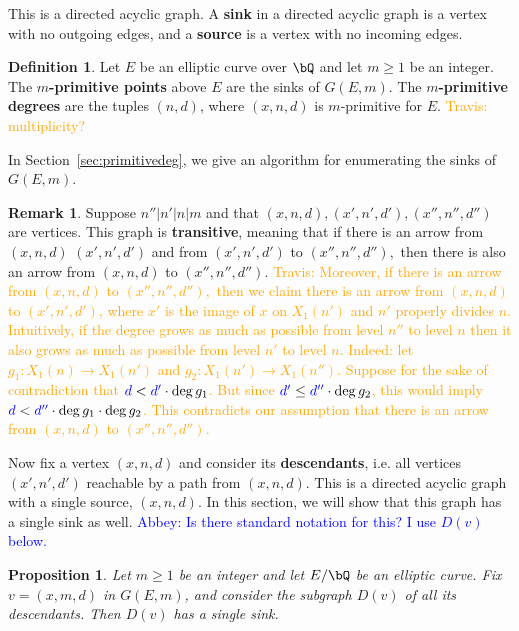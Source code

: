 \documentclass[11pt,reqno]{amsart}
\theoremstyle{plain}
\newtheorem{proposition}[theorem]{Proposition}
\theoremstyle{definition}
\newtheorem{remark}[theorem]{Remark}
\newtheorem{definition}[theorem]{Definition}
\newcommand{\Q}{\bQ}
\newcommand{\abbey}[1]{\textcolor{blue}{Abbey: #1}}
\newcommand{\travis}[1]{\textcolor{orange}{Travis: #1}}
\newcommand{\abedit}[1]{{\color{blue} #1}}
\begin{document}
This is a directed acyclic graph. A \textbf{sink} in a directed acyclic graph is a vertex with no outgoing edges, and a \textbf{source} is a vertex with no incoming edges. 

\begin{definition}\label{def:mprimitive}
    Let $E$ be an elliptic curve over $\Q$ and let $m\geq 1$ be an integer. The \textbf{$m$-primitive points} above $E$ are the sinks \abedit{of} $G(E,m)$. The \textbf{$m$-primitive degrees} are the tuples $(n,d)$, where $(x,n,d)$ is $m$-primitive for $E$. \travis{multiplicity?}
\end{definition}
In Section~\ref{sec:primitivedeg}, we give an algorithm for enumerating the sinks of $G(E,m)$. 
\begin{remark}
Suppose $n'' | n' | n | m$ and that $(x,n,d), (x',n',d'), (x'',n'',d'')$ are vertices. This graph is \textbf{transitive}, meaning that if there is an arrow from $(x,n,d)$ $(x',n',d')$ and from $(x',n',d')$ to $(x'',n'',d''),$ then 
there is also an arrow from $(x,n,d)$ to $(x'',n'',d'')$. \travis{Moreover, if there is an arrow from $(x,n,d)$ to $(x'',n'',d''),$ then we  claim there \abedit{is} an arrow from $(x,n,d)$ to $(x',n',d')$, \abedit{where $x'$ is the image of $x$ on $X_1(n')$ and $n'$ properly divides $n$}. Intuitively, if the degree grows as much as possible from level $n''$ to level $n$ then it also grows as much as possible from level $n'$ to level $n$. Indeed: let $g_1:X_1(n) \rightarrow X_1(n')$ and $g_2:X_1(n') \rightarrow X_1(n'')$. Suppose for the sake of contradiction that  $\abedit{d}<\abedit{d'}\cdot\deg g_1$. But since $\abedit{d'} \leq \abedit{d''} \cdot \deg g_2$, this would imply $\abedit{d}<\abedit{d''} \cdot\deg g_1\cdot \deg g_2 $. This contradicts our assumption that there is an arrow from $(x,n,d)$ to $(x'',n'',d'')$.}    
\end{remark}


Now fix a vertex $(x,n,d)$ and consider its \textbf{descendants}, i.e. all vertices $(x',n',d')$ reachable by a path from $(x,n,d)$. This is a directed acyclic graph with a single source, $(x,n,d)$. \abedit{In this section, we will show that this graph has a single sink as well.}    \abbey{Is there standard notation for this? I use $D(v)$ below.}

\begin{proposition}\label{Prop:single_sink}
    Let $m\geq 1$ be an integer and let $E/\Q$ be an elliptic curve. Fix $v=(x,m,d)$ in $G(E,m)$, and consider the subgraph $D(v)$ of all its descendants. Then $D(v)$ has a single sink.
\end{proposition}
\end{document}
